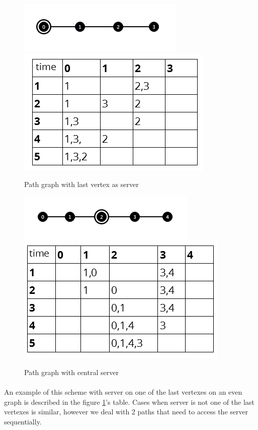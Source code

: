 \documentclass[a4paper,TexShade]{class}
\begin{document}
\begin{figure}
\centering
\caption{Path graph with last vertex as server} \label{fig:path-last-even}
\includegraphics[width=0.5\linewidth ,natwidth=303,natheight=94]{images/path-last-even.png}
\bigskip
\includegraphics[width=0.6\linewidth ,natwidth=356,natheight=231]{images/path-last-even-table.png}
\end{figure}

\begin{figure}
\centering
\caption{Path graph with central server} \label{fig:path-centre-odd}
\includegraphics[width=0.55\linewidth ,natwidth=323,natheight=87]{images/path-centre-odd.png}
\bigskip
\includegraphics[width=0.6\linewidth ,natwidth=384,natheight=229]{images/path-centre-odd-table.png}
\end{figure}

\newpage
\paragraph{} An example of this scheme with server on one of the last vertexes on an even graph is described in the figure \ref{fig:path-last-even}'s table. Cases when server is not one of the last vertexes is similar, however we deal with 2 paths that need to access the server sequentially. 
\end{document}
